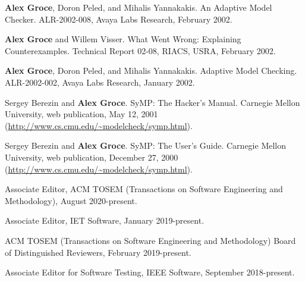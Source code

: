 \documentclass[ComputerScience]{vita}
\begin{document}
\begin{vita}
\begin{Technical Reports}
\item
{\bf Alex Groce}, Doron Peled, and Mihalis Yannakakis.
 An Adaptive Model Checker.
\newblock ALR-2002-008, Avaya Labs Research, February 2002.

\item
{\bf Alex Groce} and Willem Visser.
\newblock What Went Wrong: Explaining Counterexamples.
\newblock Technical Report 02-08, RIACS, USRA, February 2002.

\item
{\bf Alex Groce}, Doron Peled, and Mihalis Yannakakis.
\newblock Adaptive Model Checking.
\newblock ALR-2002-002, Avaya Labs Research, January 2002.

\item
Sergey Berezin and {\bf Alex Groce}.
\newblock SyMP: The Hacker's Manual.
\newblock Carnegie Mellon University, web publication, May 12, 2001 (\url{http://www.cs.cmu.edu/~modelcheck/symp.html}).

\item
Sergey Berezin and {\bf Alex Groce}.
\newblock SyMP: The User's Guide.
\newblock Carnegie Mellon University, web publication, December 27, 2000 (\url{http://www.cs.cmu.edu/~modelcheck/symp.html}).
\end{Technical Reports}

\begin{Professional Activities and Service}
  \item Associate Editor, ACM TOSEM (Transactions on Software Engineering and
    Methodology), 
    August 2020-present.
  
  \item Associate Editor, IET Software, 
    January 2019-present.

  \item ACM TOSEM (Transactions on Software Engineering and
    Methodology) Board of Distinguished Reviewers, February 2019-present.
  
  \item Associate Editor for Software Testing, IEEE Software,
    September 2018-present.


\end{Professional Activities and Service}
\end{vita}
\end{document}
